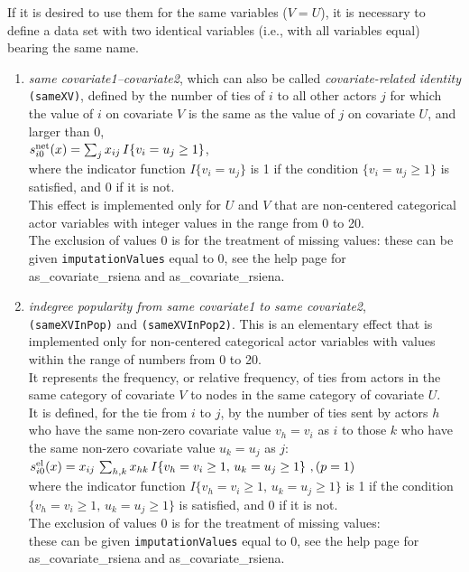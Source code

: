 \documentclass[a4paper,fleqn,11pt]{article}
\newcommand{\+}{\, + \,}
\newcommand{\sfn}[1]{\textsf{#1}}
\newcommand{\vit}{\theenumi}
\newcounter{savenumi}
\begin{document}
If it is desired to use them for the same variables ($V = U$),
it is necessary to define a data set with two identical variables
(i.e., with all variables equal) bearing the same name.

\begin{enumerate}
\setcounter{enumi}{\value{savenumi}}

 \item \emph{same covariate1--covariate2}, which can also be called {\em covariate-related identity}
 \texttt{(sameXV)},  defined by the
 number of ties of $i$ to all other actors $j$ for which the value of $i$
 on covariate $V$ is the same as the value of $j$ on covariate $U$,
 and larger than 0,\\[0.3em]
 $s^{\rm net}_{i\vit}(x) = \sum_j x_{ij}\, I\{v_i = u_j \geq 1\} $,\\[0.3em]
 where the indicator function $I\{v_i = u_j \} $ is 1 if the condition $\{v_i = u_j \geq 1\} $
 is satisfied, and 0 if it is not.\\
 This effect is implemented only for $U$ and $V$ that are non-centered categorical
  actor variables with integer values in the range from 0 to 20.\\
  The exclusion of values 0 is for the treatment of missing values:
  these can be given \texttt{imputationValues}  equal to 0,
  see the help page for \sfn{as\_covariate\_rsiena} and \sfn{as\_covariate\_rsiena}.

 \item \emph{indegree popularity from same covariate1 to same covariate2},\\
 \texttt{(sameXVInPop)} and \texttt{(sameXVInPop2)}.
  This is an elementary effect that is implemented only for non-centered categorical
  actor variables with values within the range of numbers from 0 to 20.\\
  It represents the frequency, or relative frequency, of ties
  from actors in the
  same category of covariate $V$ to nodes in the same category of covariate $U$.\\
 It is defined, for the tie from $i$ to $j$, by
  the number of ties sent by actors $h$ who have the same non-zero covariate value $v_h = v_i$ as $i$
  to those $k$ who have the same non-zero covariate value $u_k = u_j$ as $j$:\\[0.3em]
 $s^{\rm el}_{i\vit}(x) =  x_{ij}\, \sum_{h,k} x_{hk}\, I\{v_h = v_i \geq 1,\, u_k=u_j \geq 1\}  \ ,
             \hfill (p=1) $\\[0.3em]
 where the indicator function $ I\{v_h = v_i\geq 1,\, u_k=u_j \geq 1 \} $ is 1
 if the condition $\{v_h = v_i \geq 1,\, u_k=u_j \geq 1 \} $ is satisfied, and 0 if it is not.\\
  The exclusion of values 0 is for the treatment of missing values:\\
  these can be given \texttt{imputationValues}  equal to 0,
  see the help page for \sfn{as\_covariate\_rsiena} and \sfn{as\_covariate\_rsiena}.


\end{enumerate}
\end{document}

